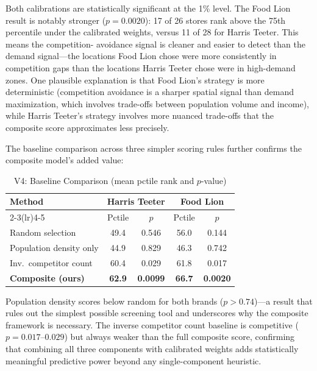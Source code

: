 \documentclass[conference]{IEEEtran}
\begin{document}
Both calibrations are statistically significant at the 1\% level.
The Food Lion result is notably stronger ($p = 0.0020$): 17 of
26 stores rank above the 75th percentile under the calibrated weights,
versus 11 of 28 for Harris Teeter. This means the competition-
avoidance signal is cleaner and easier to detect than the demand
signal---the locations Food Lion chose were more consistently in
competition gaps than the locations Harris Teeter chose were in
high-demand zones. One plausible explanation is that Food Lion's
strategy is more deterministic (competition avoidance is a sharper
spatial signal than demand maximization, which involves trade-offs
between population volume and income), while Harris Teeter's strategy
involves more nuanced trade-offs that the composite score approximates
less precisely.

The baseline comparison across three simpler scoring rules further
confirms the composite model's added value:

\begin{table}[!t]
\centering
\caption{V4: Baseline Comparison (mean pctile rank and $p$-value)}
\label{tab:v4_baseline}
\begin{tabular}{lcccc}
\toprule
\multirow{2}{*}{\textbf{Method}} &
\multicolumn{2}{c}{\textbf{Harris Teeter}} &
\multicolumn{2}{c}{\textbf{Food Lion}} \\
\cmidrule(lr){2-3}\cmidrule(lr){4-5}
& Pctile & $p$ & Pctile & $p$ \\
\midrule
Random selection         & 49.4 & 0.546 & 56.0 & 0.144 \\
Population density only  & 44.9 & 0.829 & 46.3 & 0.742 \\
Inv.\ competitor count   & 60.4 & 0.029 & 61.8 & 0.017 \\
\textbf{Composite (ours)}& \textbf{62.9} & \textbf{0.0099}
                         & \textbf{66.7} & \textbf{0.0020} \\
\bottomrule
\end{tabular}
\end{table}

Population density scores below random for both brands
($p > 0.74$)---a result that rules out the simplest possible
screening tool and underscores why the composite framework is
necessary. The inverse competitor count baseline is competitive
($p = 0.017$--$0.029$) but always weaker than the full composite
score, confirming that combining all three components with calibrated
weights adds statistically meaningful predictive power beyond any
single-component heuristic.
\end{document}
